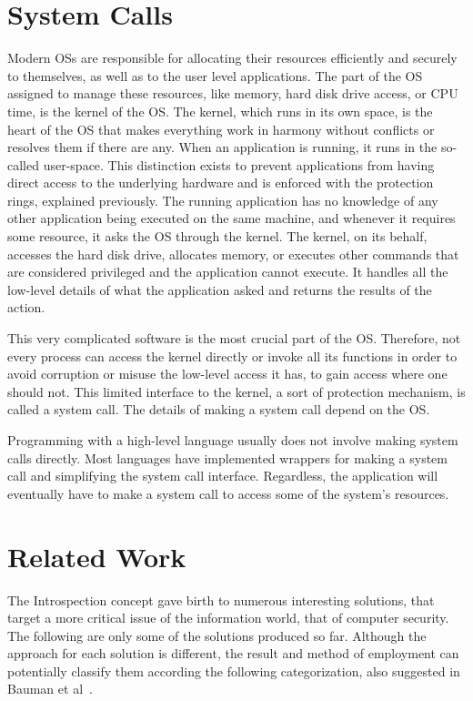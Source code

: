\section{System Calls}\label{sec:syscalls}
Modern \ac{OS}s are responsible for allocating their resources efficiently and securely to themselves, as well as to the user level applications. The part of the \ac{OS} assigned to manage these resources, like memory, hard disk drive access, or \ac{CPU} time, is the kernel of the \ac{OS}. The kernel, which runs in its own space, is the heart of the \ac{OS} that makes everything work in harmony without conflicts or resolves them if there are any. When an application is running, it runs in the so-called user-space. This distinction exists to prevent applications from having direct access to the underlying hardware and is enforced with the protection rings, explained previously. The running application has no knowledge of any other application being executed on the same machine, and whenever it requires some resource, it asks the \ac{OS} through the kernel. The kernel, on its behalf, accesses the hard disk drive, allocates memory, or executes other commands that are considered privileged and the application cannot execute. It handles all the low-level details of what the application asked and returns the results of the action. 

\par This very complicated software is the most crucial part of the \ac{OS}. Therefore, not every process can access the kernel directly or invoke all its functions in order to avoid corruption or misuse the low-level access it has, to gain access where one should not. This limited interface to the kernel, a sort of protection mechanism, is called a system call. The details of making a system call depend on the \ac{OS}.

\par Programming with a high-level language usually does not involve making system calls directly. Most languages have implemented wrappers for making a system call and simplifying the system call interface. Regardless, the application will eventually have to make a system call to access some of the system's resources.


\section{Related Work}\label{sec:related}
The Introspection concept gave birth to numerous interesting solutions, that target a more critical issue of the information world, that of computer security. The following are only some of the solutions produced so far. Although the approach for each solution is different, the result and method of employment can potentially classify them according the following categorization, also suggested in Bauman et al~\cite{bauman2015survey}.

